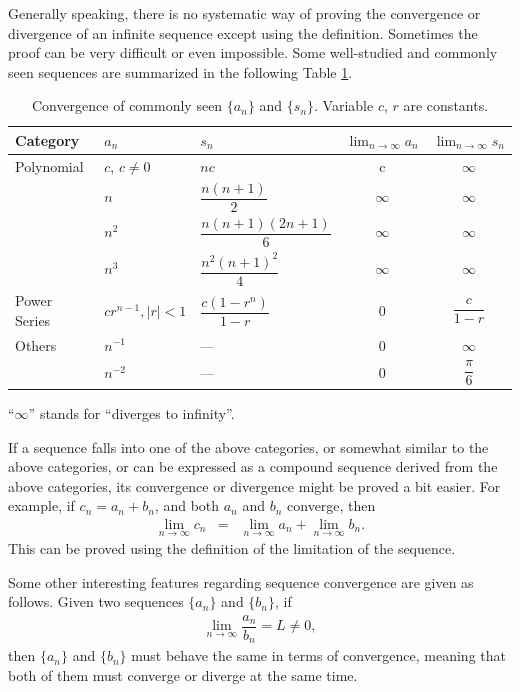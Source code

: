 Generally speaking, there is no systematic way of proving the convergence or divergence of an infinite sequence except using the definition. Sometimes the proof can be very difficult or even impossible. Some well-studied and commonly seen sequences are summarized in the following Table \ref{chi1table:sequencexample}.
\begin{table}[!htb]
\caption{Convergence of commonly seen $\{a_n\}$ and $\{s_n\}$. Variable $c$, $r$ are constants.} \label{chi1table:sequencexample}
\begin{tabular}{lllcc}\hline
Category & $a_n$ & $s_n$ & $\lim_{n\rightarrow\infty}a_n$ & $\lim_{n\rightarrow\infty}s_n$ \\ \hline
Polynomial & $c$, $c\neq 0$ & $nc$ & c & $\infty$ \\
& $n$ & $\dfrac{n(n+1)}{2}$ & $\infty$ & $\infty$ \\
& $n^2$ & $\dfrac{n(n+1)(2n+1)}{6}$ & $\infty$ & $\infty$ \\
& $n^3$ & $\dfrac{n^2(n+1)^2}{4}$ & $\infty$ & $\infty$ \\
Power Series & $cr^{n-1}, |r|<1$ & $\dfrac{c(1-r^n)}{1-r}$ & $0$ & $\dfrac{c}{1-r}$ \\
Others & $n^{-1}$ & --- & $0$ & $\infty$ \\
& $n^{-2}$ & --- & $0$ & $\dfrac{\pi}{6}$ \\ \hline
\end{tabular}
\footnotesize{``$\infty$'' stands for ``diverges to infinity''.}
\end{table}

If a sequence falls into one of the above categories, or somewhat similar to the above categories, or can be expressed as a compound sequence derived from the above categories, its convergence or divergence might be proved a bit easier. For example, if $c_n = a_n + b_n$, and both ${a_n}$ and ${b_n}$ converge, then
\begin{eqnarray}
  \lim_{n \rightarrow \infty}c_n &=& \lim_{n \rightarrow \infty}a_n + \lim_{n \rightarrow \infty}b_n. \nonumber
\end{eqnarray} This can be proved using the definition of the limitation of the sequence.

Some other interesting features regarding sequence convergence are given as follows. Given two sequences $\{a_n\}$ and $\{b_n\}$, if
\begin{eqnarray}
  \lim_{n\rightarrow\infty} \dfrac{a_n}{b_n} = L \neq 0, \nonumber
\end{eqnarray}
then $\{a_n\}$ and $\{b_n\}$ must behave the same in terms of convergence, meaning that both of them must converge or diverge at the same time.

